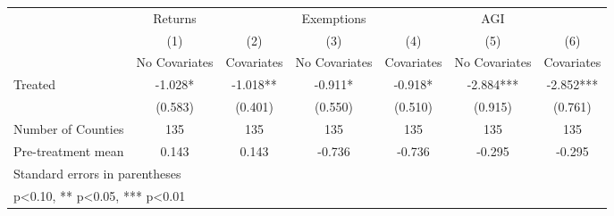 {
\def\sym#1{\ifmmode^{#1}\else\(^{#1}\)\fi}
\begin{tabular}{l*{6}{c}}
\hline\hline
            &     Returns   &               &  Exemptions   &               &         AGI   &               \\
            &\multicolumn{1}{c}{(1)}&\multicolumn{1}{c}{(2)}&\multicolumn{1}{c}{(3)}&\multicolumn{1}{c}{(4)}&\multicolumn{1}{c}{(5)}&\multicolumn{1}{c}{(6)}\\
            &\multicolumn{1}{c}{No Covariates}&\multicolumn{1}{c}{Covariates}&\multicolumn{1}{c}{No Covariates}&\multicolumn{1}{c}{Covariates}&\multicolumn{1}{c}{No Covariates}&\multicolumn{1}{c}{Covariates}\\
\hline
Treated     &      -1.028*  &      -1.018** &      -0.911*  &      -0.918*  &      -2.884***&      -2.852***\\
            &     (0.583)   &     (0.401)   &     (0.550)   &     (0.510)   &     (0.915)   &     (0.761)   \\
\hline
Number of Counties&         135   &         135   &         135   &         135   &         135   &         135   \\
Pre-treatment mean&       0.143   &       0.143   &      -0.736   &      -0.736   &      -0.295   &      -0.295   \\
\hline\hline
\multicolumn{7}{l}{\footnotesize Standard errors in parentheses}\\
\multicolumn{7}{l}{\footnotesize * p<0.10, ** p<0.05, *** p<0.01}\\
\end{tabular}
}
